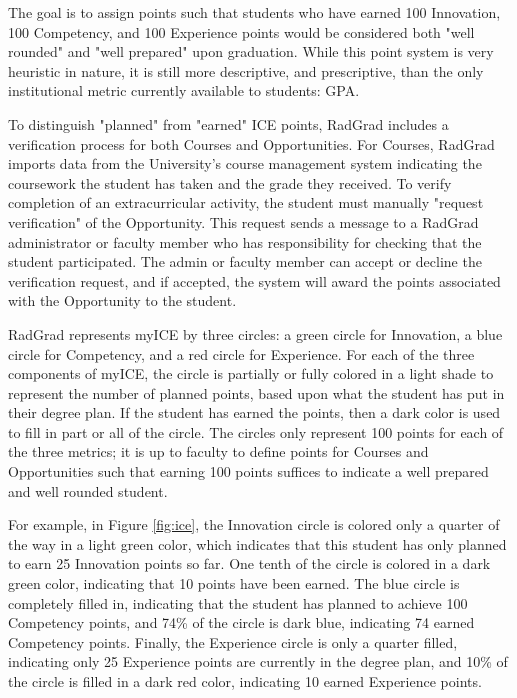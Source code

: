 \documentclass[acmsmall]{acmart}
\begin{document}
The goal is to assign points such that students who have earned 100 Innovation, 100 Competency, and 100 Experience points would be considered both "well rounded" and "well prepared" upon graduation.  While this point system is very heuristic in nature, it is still more descriptive, and prescriptive, than the only institutional metric currently available to students: GPA.

To distinguish "planned" from "earned" ICE points, RadGrad includes a verification process for both Courses and Opportunities. For Courses, RadGrad imports data from the University's course management system indicating the coursework the student has taken and the grade they received.  To verify completion of an extracurricular activity, the student must manually "request verification" of the Opportunity.  This request sends a message to a RadGrad administrator or faculty member who has responsibility for checking that the student participated. The admin or faculty member can accept or decline the verification request, and if accepted, the system will award the points associated with the Opportunity to the student.

RadGrad represents myICE by three circles: a green circle for Innovation, a blue circle for Competency, and a red circle for Experience. For each of the three components of myICE, the circle is partially or fully colored in a light shade to represent the number of planned points, based upon what the student has put in their degree plan. If the student has earned the points, then a dark color is used to fill in part or all of the circle. The circles only represent 100 points for each of the three metrics; it is up to faculty to define points for Courses and Opportunities such that earning 100 points suffices to indicate a well prepared and well rounded student.

For example, in Figure \ref{fig:ice}, the Innovation circle is colored only a quarter of the way in a light green color, which indicates that this student has only planned to earn 25 Innovation points so far. One tenth of the circle is colored in a dark green color, indicating that 10 points have been earned. The blue circle is completely filled in, indicating that the student has planned to achieve 100 Competency points, and 74\% of the circle is dark blue, indicating 74 earned Competency points.  Finally, the Experience circle is only a quarter filled, indicating only 25 Experience points are currently in the degree plan, and 10\% of the circle is filled in a dark red color, indicating 10 earned Experience points.
\end{document}
